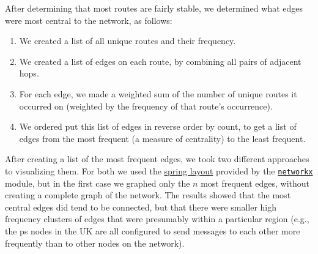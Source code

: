 \documentclass{finalreport}
\begin{document}
After determining that most routes are fairly stable, we determined what edges were most central to the network, as follows:

\begin{enumerate}
	\item We created a list of all unique routes and their frequency.
	\item We created a list of edges on each route, by combining all pairs of adjacent \glspl{hop}.
	\item For each edge, we made a weighted sum of the number of unique routes it occurred on (weighted by the frequency of that route's occurrence).
	\item We ordered put this list of edges in reverse order by count, to get a list of edges from the most frequent (a measure of centrality) to the least frequent.
\end{enumerate}

After creating a list of the most frequent edges, we took two different approaches to visualizing them. For both we used the \href{https://networkx.github.io/documentation/stable/reference/generated/networkx.drawing.layout.spring_layout.html}{spring layout} provided by the \hyperref[nx]{\texttt{networkx}} module, but in the first case we graphed only the $n$ most frequent edges, without creating a complete graph of the network. The results showed that the most central edges did tend to be connected, but that there were smaller high frequency clusters of edges that were presumably within a particular region (e.g., the \gls{ps} nodes in the UK are all configured to send messages to each other more frequently than to other nodes on the network).
\end{document}

